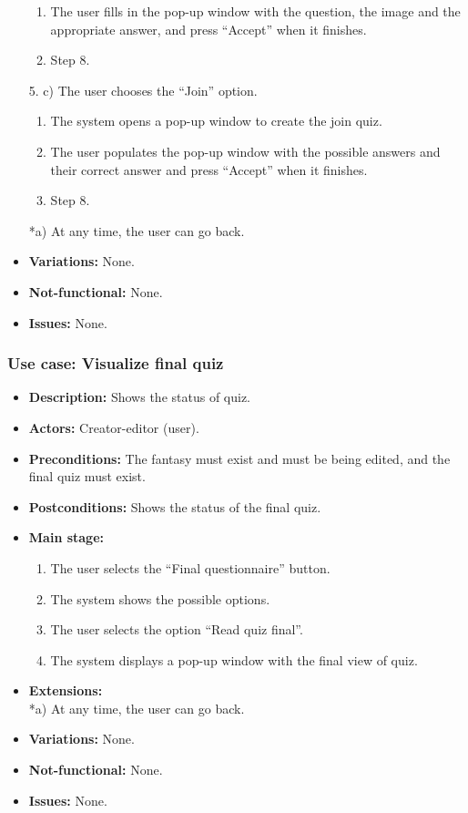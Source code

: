 \begin{itemize}
\begin{enumerate}
		\item The user fills in the pop-up window with the question, the image and the appropriate answer, and press ``Accept'' when it finishes.
		\item Step 8.
	\end{enumerate}
	5. c) The user chooses the ``Join'' option.
	\begin{enumerate}
		\item The system opens a pop-up window to create the join quiz.
		\item The user populates the pop-up window with the possible answers and their correct answer and press ``Accept'' when it finishes.
		\item Step 8.
	\end{enumerate}
	*a) At any time, the user can go back.
	\item \textbf{Variations:} None.
	\item \textbf{Not-functional:} None.
	\item \textbf{Issues:} None.
\end{itemize}

\subsubsection{Use case: Visualize final quiz}
\begin{itemize}
	\item \textbf{Description:} Shows the status of quiz.
	\item \textbf{Actors:} Creator-editor (user).
	\item \textbf{Preconditions:} The fantasy must exist and must be being edited, and the final quiz must exist.
	\item \textbf{Postconditions:} Shows the status of the final quiz.
	\item \textbf{Main stage:}
	\begin{enumerate}
		\item The user selects the ``Final questionnaire'' button.
		\item The system shows the possible options.
		\item The user selects the option ``Read quiz final''.
		\item The system displays a pop-up window with the final view of quiz.
	\end{enumerate}
	\item \textbf{Extensions:} \\ *a) At any time, the user can go back.
	\item \textbf{Variations:} None.
	\item \textbf{Not-functional:} None.
	\item \textbf{Issues:} None.
\end{itemize}

